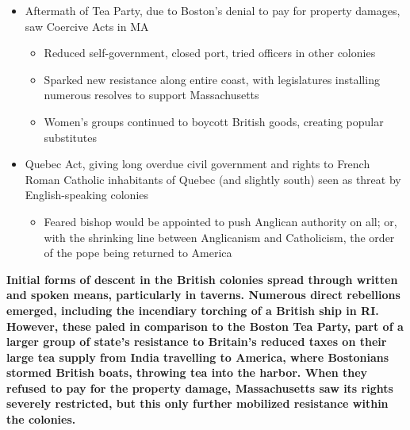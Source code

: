 \documentclass[a4paper]{article}
\begin{document}
{\begin{itemize}
\begin{itemize}
            \begin{itemize}
                \item Women had always been key players in resistance activities (\textit{ex}: Mercy Otis Warren, with satirical plays)
                \begin{itemize}
                    \item Formed "Daughters of Liberty" in 1760s, who often mocked men for insufficient fervor; challenged tea in 1773
                \end{itemize}
                \item Plans emerged to prevent cargoes of EIC from arriving in ports 
                \begin{itemize}
                    \item In Philadelphia/NYC, tea never left ships; in Charles Town, stored in public warehouses
                    \item Boston, failing to prevent ships, saw group of Patriots break into three ships and toss tea chests into harbor 
                \end{itemize}
            \end{itemize}
        \end{itemize}
        \item Aftermath of Tea Party, due to Boston's denial to pay for property damages, saw Coercive Acts in MA
        \begin{itemize}
            \item Reduced self-government, closed port, tried officers in other colonies
            \item Sparked new resistance along entire coast, with legislatures installing numerous resolves to support Massachusetts
            \item Women's groups continued to boycott British goods, creating popular substitutes
        \end{itemize}
        \item Quebec Act, giving long overdue civil government and rights to French Roman Catholic inhabitants of Quebec (and slightly south) seen as threat by English-speaking colonies
        \begin{itemize}
            \item Feared bishop would be appointed to push Anglican authority on all; or, with the shrinking line between Anglicanism and Catholicism, the order of the pope being returned to America
        \end{itemize}
    \end{itemize}
    \textbf{Initial forms of descent in the British colonies spread through written and spoken means, particularly in taverns. Numerous direct rebellions emerged, including the incendiary torching of a British ship in RI. However, these paled in comparison to the Boston Tea Party, part of a larger group of state's resistance to Britain's reduced taxes on their large tea supply from India travelling to America, where Bostonians stormed British boats, throwing tea into the harbor. When they refused to pay for the property damage, Massachusetts saw its rights severely restricted, but this only further mobilized resistance within the colonies.}}
    
\end{document}
